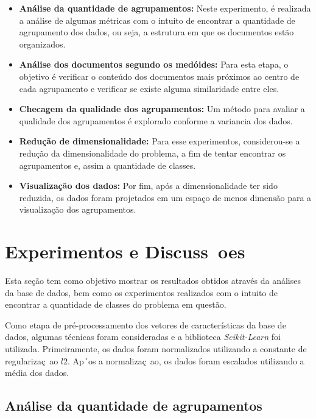 \documentclass[conference]{IEEEtran}
\begin{document}
\begin{itemize}
	\item \small \textbf{Análise da quantidade de agrupamentos:} Neste experimento, é realizada a análise de algumas métricas com o intuito de encontrar a quantidade de agrupamento dos dados, ou seja, a estrutura em que os documentos estão organizados.
	
	\item \small \textbf{Análise dos documentos segundo os medóides:} Para esta etapa, o objetivo é verificar o conteúdo dos documentos mais próximos ao centro de cada agrupamento e verificar se existe alguma similaridade entre eles.  
	
	\item \small \textbf{Checagem da qualidade dos agrupamentos:} Um método para avaliar a qualidade dos agrupamentos é explorado conforme a variancia dos dados.
	
	\item \small \textbf{Redução de dimensionalidade:} Para esse experimentos, considerou-se a redução da dimensionalidade do problema, a fim de tentar encontrar os agrupamentos e, assim a quantidade de classes.
	
	\item \small \textbf{Visualização dos dados:} Por fim, após a dimensionalidade ter sido reduzida, os dados foram projetados em um espaço de menos dimensão para a visualização dos agrupamentos.
	
\end{itemize}

\section{Experimentos e Discuss~oes} \label{sec:exp}

Esta seção tem como objetivo mostrar os resultados obtidos através da análises da base de dados, bem como os experimentos realizados com o intuito de encontrar a quantidade de classes do problema em questão. 

Como etapa de pré-processamento dos vetores de características da base de dados, algumas técnicas foram consideradas e a biblioteca \emph{Scikit-Learn} foi utilizada. Primeiramente, os dados foram normalizados utilizando a constante de regularizaç~ao $l2$. Ap´os a normalizaç~ao, os dados foram escalados utilizando a média dos dados. 

\subsection{Análise da quantidade de agrupamentos}
\end{document}
